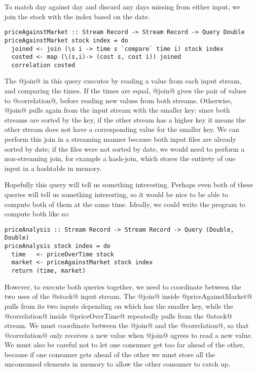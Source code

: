 To match day against day and discard any days missing from either input, we join the stock with the index based on the date.


\begin{lstlisting}
priceAgainstMarket :: Stream Record -> Stream Record -> Query Double
priceAgainstMarket stock index = do
  joined <- join (\s i -> time s `compare` time i) stock index
  costed <- map (\(s,i)-> (cost s, cost i)) joined
  correlation costed
\end{lstlisting}

The @join@ in this query executes by reading a value from each input stream, and comparing the times.
If the times are equal, @join@ gives the pair of values to @correlation@, before reading new values from both streams.
Otherwise, @join@ pulls again from the input stream with the smaller key: since both streams are sorted by the key, if the other stream has a higher key it means the other stream does not have a corresponding value for the smaller key.
We can perform this join in a streaming manner because both input files are already sorted by date; if the files were not sorted by date, we would need to perform a non-streaming join, for example a hash-join, which stores the entirety of one input in a hashtable in memory.

Hopefully this query will tell us something interesting.
Perhaps even both of these queries will tell us something interesting, so it would be nice to be able to compute both of them at the same time.
Ideally, we could write the program to compute both like so:

\begin{lstlisting}
priceAnalysis :: Stream Record -> Stream Record -> Query (Double, Double)
priceAnalysis stock index = do
  time   <- priceOverTime stock
  market <- priceAgainstMarket stock index
  return (time, market)
\end{lstlisting}

However, to execute both queries together, we need to coordinate between the two uses of the @stock@ input stream.
The @join@ inside @priceAgainstMarket@ pulls from its two inputs depending on which has the smaller key, while the @correlation@ inside @priceOverTime@ repeatedly pulls from the @stock@ stream.
We must coordinate between the @join@ and the @correlation@, so that @correlation@ only receives a new value when @join@ agrees to read a new value.
We must also be careful not to let one consumer get too far ahead of the other, because if one consumer gets ahead of the other we must store all the unconsumed elements in memory to allow the other consumer to catch up.


